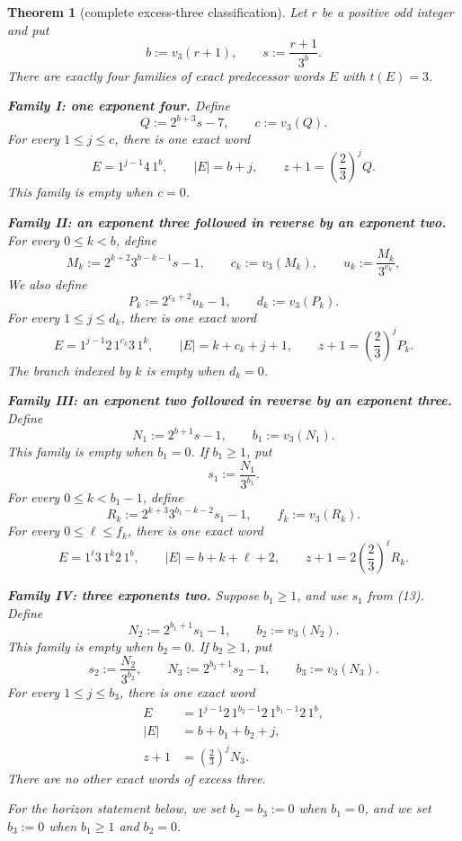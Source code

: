 \documentclass[11pt]{article}
\newtheorem{theorem}{Theorem}
\begin{document}
\begin{theorem}[complete excess-three classification]
Let $r$ be a positive odd integer and put
\[
 b:=v_3(r+1),
 \qquad s:=\frac{r+1}{3^b}.
 \tag{6}
\]
There are exactly four families of exact predecessor words $E$ with
$t(E)=3$.

\medskip
\noindent\textbf{Family I: one exponent four.}
Define
\[
 Q:=2^{b+3}s-7,
 \qquad c:=v_3(Q).
 \tag{7}
\]
For every $1\leq j\leq c$, there is one exact word
\[
 \boxed{
 E=1^{j-1}4\,1^b,
 \qquad |E|=b+j,
 \qquad z+1=\left(\frac23\right)^jQ.}
 \tag{8}
\]
This family is empty when $c=0$.

\medskip
\noindent\textbf{Family II: an exponent three followed in reverse by an
exponent two.}
For every $0\leq k<b$, define
\[
 M_k:=2^{k+2}3^{b-k-1}s-1,
 \qquad c_k:=v_3(M_k),
 \qquad u_k:=\frac{M_k}{3^{c_k}},
 \tag{9}
\]
We also define
\[
 P_k:=2^{c_k+2}u_k-1,
 \qquad d_k:=v_3(P_k).
 \tag{10}
\]
For every $1\leq j\leq d_k$, there is one exact word
\[
 \boxed{
 E=1^{j-1}2\,1^{c_k}3\,1^k,
 \qquad |E|=k+c_k+j+1,
 \qquad z+1=\left(\frac23\right)^jP_k.}
 \tag{11}
\]
The branch indexed by $k$ is empty when $d_k=0$.

\medskip
\noindent\textbf{Family III: an exponent two followed in reverse by an
exponent three.}
Define
\[
 N_1:=2^{b+1}s-1,
 \qquad b_1:=v_3(N_1).
 \tag{12}
\]
This family is empty when $b_1=0$.  If $b_1\geq1$, put
\[
 s_1:=\frac{N_1}{3^{b_1}}.
 \tag{13}
\]
For every $0\leq k<b_1-1$, define
\[
 R_k:=2^{k+3}3^{b_1-k-2}s_1-1,
 \qquad f_k:=v_3(R_k).
 \tag{14}
\]
For every $0\leq\ell\leq f_k$, there is one exact word
\[
 \boxed{
 E=1^\ell3\,1^k2\,1^b,
 \qquad |E|=b+k+\ell+2,
 \qquad z+1=2\left(\frac23\right)^\ell R_k.}
 \tag{15}
\]

\newpage
\noindent\textbf{Family IV: three exponents two.}
Suppose $b_1\geq1$, and use $s_1$ from (13).  Define
\[
 N_2:=2^{b_1+1}s_1-1,
 \qquad b_2:=v_3(N_2).
 \tag{16}
\]
This family is empty when $b_2=0$.  If $b_2\geq1$, put
\[
 s_2:=\frac{N_2}{3^{b_2}},
 \qquad
 N_3:=2^{b_2+1}s_2-1,
 \qquad b_3:=v_3(N_3).
 \tag{17}
\]
For every $1\leq j\leq b_3$, there is one exact word
\[
 \boxed{
 \begin{aligned}
 E&=1^{j-1}2\,1^{b_2-1}2\,1^{b_1-1}2\,1^b,\\
 |E|&=b+b_1+b_2+j,\\
 z+1&=\left(\frac23\right)^jN_3.
 \end{aligned}}
 \tag{18}
\]
There are no other exact words of excess three.

For the horizon statement below, we set $b_2=b_3:=0$ when $b_1=0$, and
we set $b_3:=0$ when $b_1\geq1$ and $b_2=0$.
\end{theorem}
\end{document}
